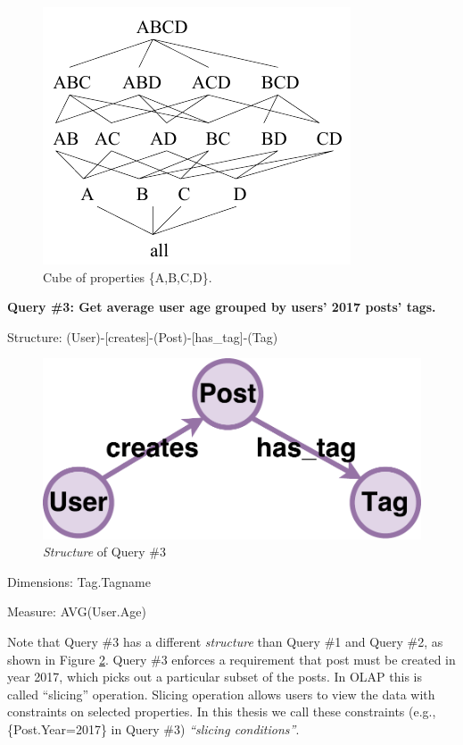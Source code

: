 \begin{figure}[H]
	\centering
	\includegraphics[scale=1.4]{pic/22.pdf}
	\caption{Cube of properties \{A,B,C,D\}.}
	\label{fig:2:2}
\end{figure}

\textbf{Query \#3: 		Get average user age grouped by users’ 2017 posts’ tags.}

Structure:	(User)-[creates]-(Post)-[has\_tag]-(Tag)
\begin{figure}[H]
	\centering
	\includegraphics[scale=0.5]{pic/meta2.pdf}
	\caption{\textit{Structure} of Query \#3}
	\label{fig:2:3}
\end{figure}


Dimensions:	{Tag.Tagname}

Measure:	{AVG(User.Age)}

Note that Query \#3 has a different \textit{structure} than Query \#1 and Query \#2, as shown in Figure \ref{fig:2:3}. Query \#3 enforces a requirement that post must be created in year 2017, which picks out a particular subset of  the posts. In OLAP this is called ``slicing'' operation. Slicing operation allows users to view the data with constraints on selected properties. In this thesis we call these constraints (e.g., \{Post.Year=2017\} in Query \#3) \textit{``slicing conditions''}.

